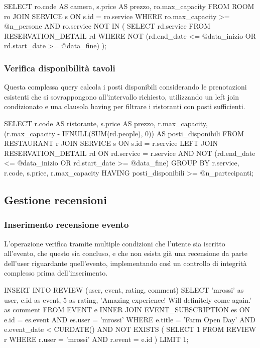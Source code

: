 \documentclass[a4paper,12pt]{report}
\begin{document}
\begin{sqlcode}[caption={Query per la disponibilità camere}]
SELECT ro.code AS camera, s.price AS prezzo, ro.max_capacity 
FROM ROOM ro 
JOIN SERVICE s ON s.id = ro.service 
WHERE ro.max_capacity >= @n_persone 
  AND ro.service NOT IN (
    SELECT rd.service 
    FROM RESERVATION_DETAIL rd 
    WHERE NOT (rd.end_date <= @data_inizio OR rd.start_date >= @data_fine)
  );
\end{sqlcode}

\subsubsection{Verifica disponibilità tavoli} 
Questa complessa query calcola i posti disponibili considerando le prenotazioni esistenti che si sovrappongono all'intervallo richiesto, utilizzando un left join condizionato e una clausola having per filtrare i ristoranti con posti sufficienti.

\begin{sqlcode}[caption={Query per la disponibilità tavoli}]
SELECT r.code AS ristorante, s.price AS prezzo, r.max_capacity,
       (r.max_capacity - IFNULL(SUM(rd.people), 0)) AS posti_disponibili 
FROM RESTAURANT r 
JOIN SERVICE s ON s.id = r.service 
LEFT JOIN RESERVATION_DETAIL rd ON rd.service = r.service 
  AND NOT (rd.end_date <= @data_inizio OR rd.start_date >= @data_fine) 
GROUP BY r.service, r.code, s.price, r.max_capacity 
HAVING posti_disponibili >= @n_partecipanti;
\end{sqlcode}

\subsection{Gestione recensioni} 

\subsubsection{Inserimento recensione evento} 
L'operazione verifica tramite multiple condizioni che l'utente sia iscritto all'evento, che questo sia concluso, e che non esista già una recensione da parte dell'user riguardante quell'evento, implementando così un controllo di integrità complesso prima dell'inserimento.

\begin{sqlcode}[caption={Query per inserimento recensione evento}]
INSERT INTO REVIEW (user, event, rating, comment) 
SELECT 'mrossi' as user, e.id as event, 5 as rating, 
       'Amazing experience! Will definitely come again.' as comment 
FROM EVENT e 
INNER JOIN EVENT_SUBSCRIPTION es ON e.id = es.event AND es.user = 'mrossi' 
WHERE e.title = 'Farm Open Day' 
  AND e.event_date < CURDATE() 
  AND NOT EXISTS (
    SELECT 1 
    FROM REVIEW r 
    WHERE r.user = 'mrossi' AND r.event = e.id
  ) 
LIMIT 1;
\end{sqlcode}
\end{document}
